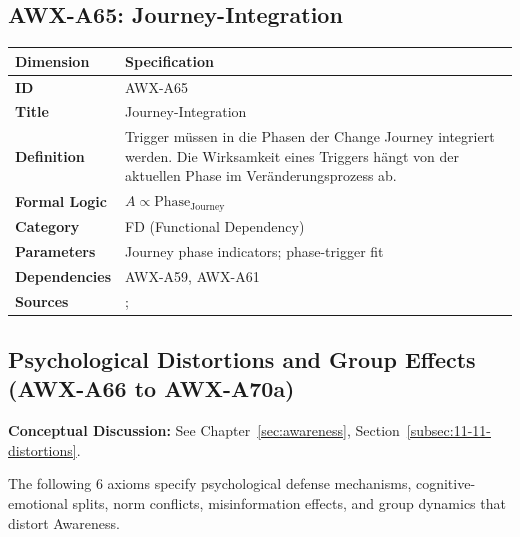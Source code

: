 
\subsection{AWX-A65: Journey-Integration}

\begin{table}[htbp]
\small
\begin{tabular}{p{3cm}p{11cm}}
\toprule
\textbf{Dimension} & \textbf{Specification} \\
\midrule
\textbf{ID} & AWX-A65 \\
\textbf{Title} & Journey-Integration \\
\textbf{Definition} & Trigger müssen in die Phasen der Change Journey integriert werden. Die Wirksamkeit eines Triggers hängt von der aktuellen Phase im Veränderungsprozess ab. \\
\textbf{Formal Logic} & $A \propto \text{Phase}_{\text{Journey}}$ \\
\textbf{Category} & FD (Functional Dependency) \\
\textbf{Parameters} & Journey phase indicators; phase-trigger fit \\
\textbf{Dependencies} & AWX-A59, AWX-A61 \\
\textbf{Sources} & \citet{prochaska1992stages}; \citet{kotter1995leading} \\
\bottomrule
\end{tabular}
\end{table}




\subsection{Psychological Distortions and Group Effects (AWX-A66 to AWX-A70a)}

\begin{cross-reference}
\textbf{Conceptual Discussion:} See Chapter~\ref{sec:awareness}, Section~\ref{subsec:11-11-distortions}.
\end{cross-reference}
The following 6 axioms specify psychological defense mechanisms, cognitive-emotional splits, norm conflicts, misinformation effects, and group dynamics that distort Awareness.

